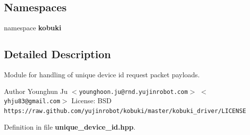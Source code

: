 \subsection*{\-Namespaces}
\begin{DoxyCompactItemize}
\item 
namespace {\bf kobuki}
\end{DoxyCompactItemize}


\subsection{\-Detailed \-Description}
\-Module for handling of unique device id request packet payloads. \begin{DoxyAuthor}{\-Author}
\-Younghun \-Ju $<${\tt younghoon.\-ju@rnd.\-yujinrobot.\-com}$>$ $<${\tt yhju83@gmail.\-com}$>$ \-License\-: \-B\-S\-D {\tt https\-://raw.\-github.\-com/yujinrobot/kobuki/master/kobuki\-\_\-driver/\-L\-I\-C\-E\-N\-S\-E} 
\end{DoxyAuthor}


\-Definition in file {\bf unique\-\_\-device\-\_\-id.\-hpp}.

